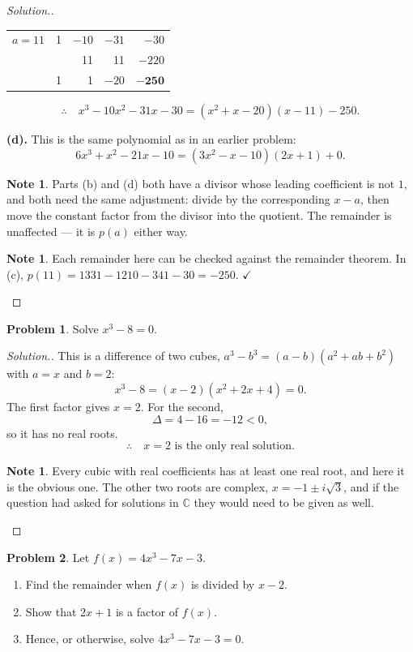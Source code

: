 \documentclass[11pt,a4paper]{article}
\theoremstyle{definition}
\newtheorem{note}[thm]{Note}
\newtheorem{problemx}{Problem}[section]
\newenvironment{problem}{\begin{problemx}}{\end{problemx}}
\newenvironment{solution}
  {\renewcommand{\qedsymbol}{}\begin{proof}[\textit{Solution}.]}
  {\end{proof}}
\let\amscheckmark\checkmark
\renewcommand{\checkmark}{\ensuremath{\amscheckmark}}
\begin{document}
\begin{solution}
\begin{table}[H]
\centering
\begin{tabular}{|c|r r r r|}
\hline
$a=11$ & 1 & $-10$ & $-31$ & $-30$\\
       &   & 11 & 11 & $-220$\\
\hline
       & 1 & 1 & $-20$ & $\mathbf{-250}$\\
\hline
\end{tabular}
\end{table}

$$\therefore\quad x^3-10x^2-31x-30=\left(x^2+x-20\right)(x-11)-250.$$

\textbf{(d).} This is the same polynomial as in an earlier problem:
$$6x^3+x^2-21x-10=\left(3x^2-x-10\right)(2x+1)+0.$$

\begin{note}
Parts (b) and (d) both have a divisor whose leading coefficient is not $1$, and both
need the same adjustment: divide by the corresponding $x-a$, then move the constant
factor from the divisor into the quotient. The remainder is unaffected --- it is
$p(a)$ either way.
\end{note}

\begin{note}
Each remainder here can be checked against the remainder theorem. In (c),
$p(11)=1331-1210-341-30=-250$. $\checkmark$
\end{note}
\end{solution}

\begin{problem}
Solve $x^3-8=0$.
\end{problem}

\begin{solution}
This is a difference of two cubes, $a^3-b^3=(a-b)\left(a^2+ab+b^2\right)$ with $a=x$ and
$b=2$:
$$x^3-8=(x-2)\left(x^2+2x+4\right)=0.$$
The first factor gives $x=2$. For the second,
$$\Delta=4-16=-12<0,$$
so it has no real roots.
$$\therefore\quad x=2 \text{ is the only real solution}.$$

\begin{note}
Every cubic with real coefficients has at least one real root, and here it is the
obvious one. The other two roots are complex, $x=-1\pm i\sqrt{3}$, and if the question
had asked for solutions in $\mathbb{C}$ they would need to be given as well.
\end{note}
\end{solution}

\begin{problem}
Let $f(x)=4x^3-7x-3$.
\begin{enumerate}
\item[(a).] Find the remainder when $f(x)$ is divided by $x-2$.
\item[(b).] Show that $2x+1$ is a factor of $f(x)$.
\item[(c).] Hence, or otherwise, solve $4x^3-7x-3=0$.
\end{enumerate}
\end{problem}
\end{document}
